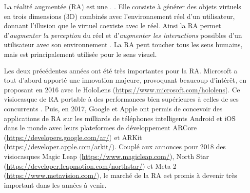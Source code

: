 La réalité augmentée (RA) est une . \citep{OQLFRA2017}. Elle consiste à générer des objets virtuels en trois dimensions (3D) combinés avec l'environnement réel d'un utilisateur, donnant l'illusion que le virtuel coexiste avec le réel. Ainsi la RA permet d'\emph{augmenter la perception} du réel et d'\emph{augmenter les interactions} possibles d'un utilisateur avec son environnement \citep{Azuma1997}. La RA peut toucher tous les sens humains, mais est principalement utilisée pour le sens visuel.


Les deux précédentes années ont été très importantes pour la RA. Microsoft a tout d'abord apporté une innovation majeure, provoquant beaucoup d'intérêt, en proposant en 2016 avec le HoloLens (\url{https://www.microsoft.com/hololens}). Ce visiocasque de RA portable à des performances bien supérieures à celles de ses concurrents . Puis, en 2017, Google et Apple ont permis de concevoir des applications de RA sur les milliards de téléphones intelligents Android et iOS dans le monde avec leurs plateformes de développement ARCore (\url{https://developers.google.com/ar/}) et ARKit (\url{https://developer.apple.com/arkit/}). Couplé aux annonces pour 2018 des visiocasques Magic Leap (\url{https://www.magicleap.com/}), North Star (\url{https://developer.leapmotion.com/northstar/}) et Meta 2 (\url{https://www.metavision.com/}), le marché de la RA est promis à devenir très important dans les années à venir.


